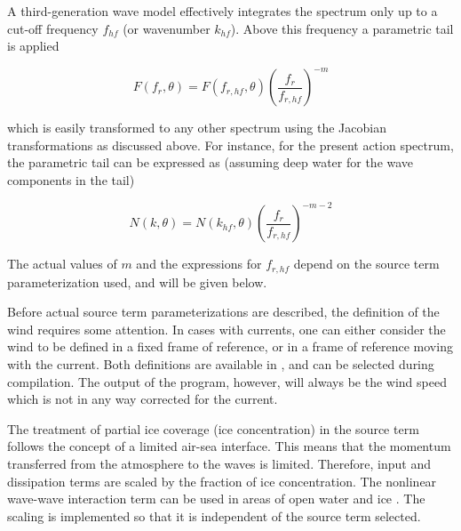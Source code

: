 \vspace{\baselineskip} \noindent
A third-generation wave model effectively integrates the spectrum only up to a
cut-off frequency $f_{hf}$ (or wavenumber $k_{hf}$). Above this frequency a
parametric tail is applied \citep[e.g.,][]{art:WAM88}


\begin{equation}
F(f_r,\theta) = F(f_{r,hf},\theta) \left ( \frac{f_r}{f_{r,hf}}
\right ) ^{-m} \label{eq:tail_E_f}
\end{equation}

\noindent
which is easily transformed to any other spectrum using the Jacobian
transformations as discussed above. For instance, for the present action
spectrum, the parametric tail can be expressed as (assuming deep water for the
wave components in the tail)


\begin{equation}
N(k,\theta) = N(k_{hf},\theta) \left ( \frac{f_r}{f_{r,hf}}
\right ) ^{-m-2} \label{eq:tail_N_k}
\end{equation}

\noindent
The actual values of $m$ and the expressions for $f_{r,hf}$ depend on the
source term parameterization used, and will be given below.

\vspace{\baselineskip} \noindent
Before actual source term parameterizations are described, the definition of
the wind requires some attention. In cases with currents, one can either
consider the wind to be defined in a fixed frame of reference, or in a frame
of reference moving with the current. Both definitions are available in \ws,
and can be selected during compilation. The output of the program, however,
will always be the wind speed which is not in any way corrected for the
current.

\vspace{\baselineskip} \noindent
The treatment of partial ice coverage (ice concentration) in the source term
follows the concept of a limited air-sea interface. This means that the momentum
transferred from the atmosphere to the waves is limited. Therefore, input and
dissipation terms are scaled by the fraction of ice concentration. The
nonlinear wave-wave interaction term can be used in areas of open water
and ice \citep{art:PL07}. The scaling is implemented so that it is independent
of the source term selected.

